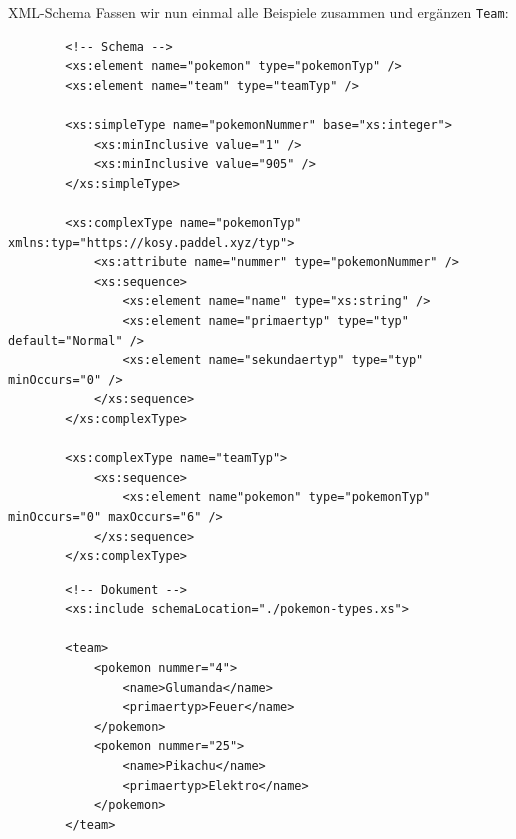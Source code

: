 \begin{example}{XML-Schema}
    Fassen wir nun einmal alle Beispiele zusammen und ergänzen \texttt{Team}:

    \begin{lstlisting}
        <!-- Schema -->
        <xs:element name="pokemon" type="pokemonTyp" />
        <xs:element name="team" type="teamTyp" />

        <xs:simpleType name="pokemonNummer" base="xs:integer">
            <xs:minInclusive value="1" />
            <xs:minInclusive value="905" />
        </xs:simpleType>

        <xs:complexType name="pokemonTyp" xmlns:typ="https://kosy.paddel.xyz/typ">
            <xs:attribute name="nummer" type="pokemonNummer" />
            <xs:sequence>
                <xs:element name="name" type="xs:string" />
                <xs:element name="primaertyp" type="typ" default="Normal" />
                <xs:element name="sekundaertyp" type="typ" minOccurs="0" />
            </xs:sequence>
        </xs:complexType>

        <xs:complexType name="teamTyp">
            <xs:sequence>
                <xs:element name"pokemon" type="pokemonTyp" minOccurs="0" maxOccurs="6" />
            </xs:sequence>
        </xs:complexType>
    \end{lstlisting}

    \begin{lstlisting}
        <!-- Dokument -->
        <xs:include schemaLocation="./pokemon-types.xs">

        <team>
            <pokemon nummer="4">
                <name>Glumanda</name>
                <primaertyp>Feuer</name>
            </pokemon>
            <pokemon nummer="25">
                <name>Pikachu</name>
                <primaertyp>Elektro</name>
            </pokemon>
        </team>
    \end{lstlisting}
\end{example}

